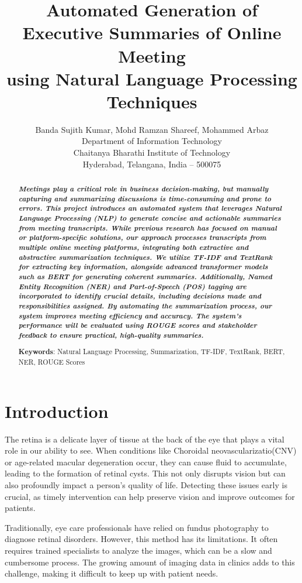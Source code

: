 \documentclass{article}
\title{Automated Generation of Executive Summaries of Online Meeting \\
using Natural Language Processing Techniques}
\author{
    Banda Sujith Kumar, Mohd Ramzan Shareef, Mohammed Arbaz \\
    Department of Information Technology \\
    Chaitanya Bharathi Institute of Technology \\
    Hyderabad, Telangana, India – 500075 \\
}
\begin{document}
\maketitle
\begin{abstract}
\textbf{\textit{
Meetings play a critical role in business decision-making, but manually capturing and summarizing discussions is time-consuming and prone to errors. This project introduces an automated system that leverages Natural Language Processing (NLP) to generate concise and actionable summaries from meeting transcripts. While previous research has focused on manual or platform-specific solutions, our approach processes transcripts from multiple online meeting platforms, integrating both extractive and abstractive summarization techniques. We utilize TF-IDF and TextRank for extracting key information, alongside advanced transformer models such as BERT for generating coherent summaries. Additionally, Named Entity Recognition (NER) and Part-of-Speech (POS) tagging are incorporated to identify crucial details, including decisions made and responsibilities assigned. By automating the summarization process, our system improves meeting efficiency and accuracy. The system's performance will be evaluated using ROUGE scores and stakeholder feedback to ensure practical, high-quality summaries.
}}

\textbf{Keywords}: Natural Language Processing, Summarization, TF-IDF, TextRank, BERT, NER, ROUGE Scores
\end{abstract}

\section{Introduction}

The retina is a delicate layer of tissue at the back of the eye that plays a vital role in our ability to see. When conditions like Choroidal neovascularizatio(CNV) or age-related macular degeneration occur, they can cause fluid to accumulate, leading to the formation of retinal cysts. This not only disrupts vision but can also profoundly impact a person's quality of life. Detecting these issues early is crucial, as timely intervention can help preserve vision and improve outcomes for patients.

Traditionally, eye care professionals have relied on fundus photography to diagnose retinal disorders. However, this method has its limitations. It often requires trained specialists to analyze the images, which can be a slow and cumbersome process. The growing amount of imaging data in clinics adds to this challenge, making it difficult to keep up with patient needs.
\end{document}
